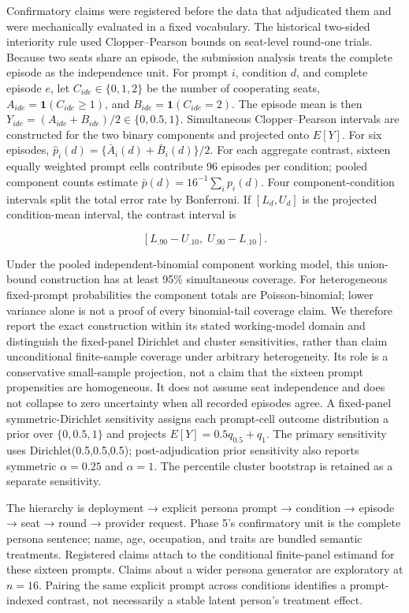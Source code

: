 \documentclass[11pt]{article}
\begin{document}
Confirmatory claims were registered before the data that adjudicated
them and were mechanically evaluated in a fixed vocabulary. The
historical two-sided interiority rule used Clopper--Pearson bounds on
seat-level round-one trials. Because two seats share an episode, the
submission analysis treats the complete episode as the independence
unit. For prompt \(i\), condition \(d\), and complete episode \(e\), let
\(C_{ide}\in\{0,1,2\}\) be the number of cooperating seats,
\(A_{ide}=\mathbf 1(C_{ide}\ge1)\), and
\(B_{ide}=\mathbf 1(C_{ide}=2)\). The episode mean is then
\(Y_{ide}=(A_{ide}+B_{ide})/2\in\{0,0.5,1\}\). Simultaneous
Clopper--Pearson intervals are constructed for the two binary components
and projected onto \(E[Y]\). For six episodes,
\(\hat p_i(d)=\{\bar A_i(d)+\bar B_i(d)\}/2\). For each aggregate
contrast, sixteen equally weighted prompt cells contribute 96 episodes
per condition; pooled component counts estimate
\(\bar p(d)=16^{-1}\sum_i p_i(d)\). Four component-condition intervals
split the total error rate by Bonferroni. If \([L_d,U_d]\) is the
projected condition-mean interval, the contrast interval is

\[[L_{.90}-U_{.10},\;U_{.90}-L_{.10}].\]

Under the pooled independent-binomial component working model, this
union-bound construction has at least 95\% simultaneous coverage. For
heterogeneous fixed-prompt probabilities the component totals are
Poisson-binomial; lower variance alone is not a proof of every
binomial-tail coverage claim. We therefore report the exact construction
within its stated working-model domain and distinguish the fixed-panel
Dirichlet and cluster sensitivities, rather than claim unconditional
finite-sample coverage under arbitrary heterogeneity. Its role is a
conservative small-sample projection, not a claim that the sixteen
prompt propensities are homogeneous. It does not assume seat
independence and does not collapse to zero uncertainty when all recorded
episodes agree. A fixed-panel symmetric-Dirichlet sensitivity assigns
each prompt-cell outcome distribution a prior over \(\{0,0.5,1\}\) and
projects \(E[Y]=0.5q_{0.5}+q_1\). The primary sensitivity uses
Dirichlet(0.5,0.5,0.5); post-adjudication prior sensitivity also reports
symmetric \(\alpha=0.25\) and \(\alpha=1\). The percentile cluster
bootstrap is retained as a separate sensitivity.

The hierarchy is deployment → explicit persona prompt → condition →
episode → seat → round → provider request. Phase 5's confirmatory unit
is the complete persona sentence; name, age, occupation, and traits are
bundled semantic treatments. Registered claims attach to the conditional
finite-panel estimand for these sixteen prompts. Claims about a wider
persona generator are exploratory at \(n=16\). Pairing the same explicit
prompt across conditions identifies a prompt-indexed contrast, not
necessarily a stable latent person's treatment effect.
\end{document}
